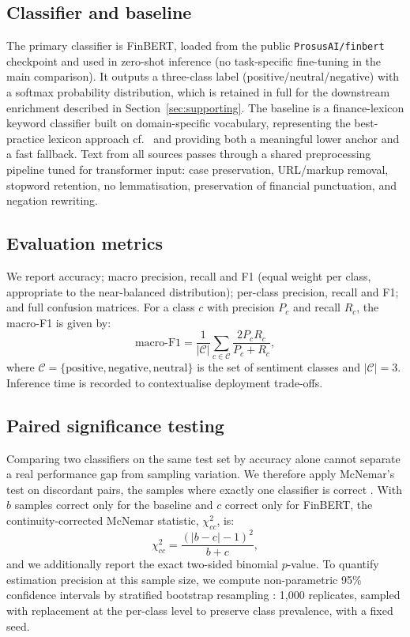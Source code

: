 \documentclass{aims}
\numberwithin{equation}{section}
\begin{document}
\subsection{Classifier and baseline}
The primary classifier is FinBERT, loaded from the public \texttt{ProsusAI/finbert}
checkpoint and used in zero-shot inference (no task-specific fine-tuning in the main
comparison). It outputs a three-class label (positive/neutral/negative) with a
softmax probability distribution, which is retained in full for the downstream
enrichment described in Section~\ref{sec:supporting}. The baseline is a
finance-lexicon keyword classifier built on domain-specific vocabulary,
representing the best-practice lexicon approach cf.~\citep{loughran2011} and
providing both a meaningful lower anchor and a fast fallback. Text from all sources
passes through a shared preprocessing pipeline tuned for transformer input: case
preservation, URL/markup removal, stopword retention, no lemmatisation, preservation
of financial punctuation, and negation rewriting.

\subsection{Evaluation metrics}
We report accuracy; macro precision, recall and F1 (equal weight per class,
appropriate to the near-balanced distribution); per-class precision, recall and F1;
and full confusion matrices. For a class $c$ with precision $P_c$ and recall $R_c$,
the macro-F1 is given by:
\begin{equation*}
\text{macro-F1} = \frac{1}{|\mathcal{C}|}\sum_{c\in\mathcal{C}}
\frac{2 P_c R_c}{P_c + R_c},
\end{equation*}
where $\mathcal{C} = \{\text{positive},\text{negative},\text{neutral}\}$ is the set
of sentiment classes and $|\mathcal{C}| = 3$. Inference time is recorded to
contextualise deployment trade-offs.

\subsection{Paired significance testing}\label{sec:sigtest}
Comparing two classifiers on the same test set by accuracy alone cannot separate a
real performance gap from sampling variation. We therefore apply McNemar's test on
discordant pairs, the samples where exactly one classifier is correct
\citep{dietterich1998}. With $b$ samples correct only for the baseline and $c$
correct only for FinBERT, the continuity-corrected McNemar statistic, $\chi^2_{cc}$,
is:
\begin{equation*}
\chi^2_{cc} = \frac{(|b-c|-1)^2}{b+c},
\end{equation*}
and we additionally report the exact two-sided binomial $p$-value. To quantify
estimation precision at this sample size, we compute non-parametric 95\% confidence
intervals by stratified bootstrap resampling \citep{efron1993}: 1{,}000 replicates,
sampled with replacement at the per-class level to preserve class prevalence, with a
fixed seed.
\end{document}
